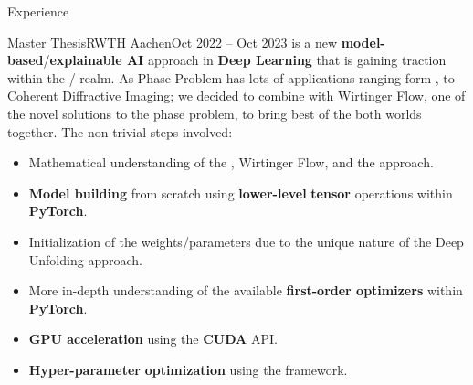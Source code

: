 \begin{cvsection}{Experience}
	\begin{cvsubsection}{Master Thesis}{RWTH Aachen}{Oct 2022 -- Oct 2023}
		 is a new \textbf{model-based}/\textbf{explainable AI} approach in \textbf{Deep Learning} that is gaining traction within the / realm. 
		As Phase Problem has lots of applications ranging form ,  to Coherent Diffractive Imaging; 
		we decided to combine  with Wirtinger Flow, one of the novel solutions to the phase problem, to bring best of the both worlds together. The non-trivial steps involved: 
		\begin{itemize}
			\item Mathematical understanding of the , Wirtinger Flow, and the  approach.
			\item \textbf{Model building} from scratch using \textbf{lower-level} \textbf{tensor} operations within \textbf{PyTorch}.
			\item Initialization of the weights/parameters due to the unique nature of the Deep Unfolding approach.
			\item More in-depth understanding of the available \textbf{first-order optimizers} within \textbf{PyTorch}.
			\item \textbf{GPU acceleration} using the \textbf{CUDA} API.
			\item \textbf{Hyper-parameter} \textbf{optimization} using the  framework.
		\end{itemize}
	\end{cvsubsection}

\end{cvsection}
